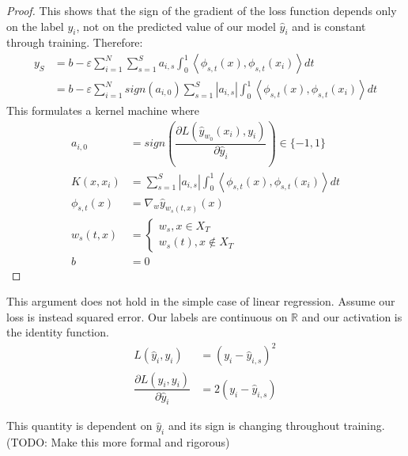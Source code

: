 \begin{proof}
This shows that the sign of the gradient of the loss function depends only on the label $y_i$, not on the predicted value of our model $\hat y_i$ and is constant through training. 
Therefore:
\begin{align}
    y_S &= b - \varepsilon \sum_{i = 1}^{N}\sum_{s = 1}^S a_{i, s}  \int_0^1 \left\langle \phi_{s,t}(x), \phi_{s,t}(x_i)\right\rangle dt\\
     &= b - \varepsilon \sum_{i = 1}^{N}sign(a_{i, 0}) \sum_{s = 1}^S |a_{i, s}| \int_0^1 \left\langle \phi_{s,t}(x), \phi_{s,t}(x_i)\right\rangle dt
\end{align}
This formulates a kernel machine where
\begin{align}
a_{i, 0} &= sign(\dfrac{\partial L(\hat y_{w_0}(x_i),  y_i)}{\partial \hat y_i}) \in \{-1, 1\} \\
K(x, x_i) &= \sum_{s = 1}^S |a_{i, s}| \int_0^1 \left\langle \phi_{s,t}(x), \phi_{s,t}(x_i)\right\rangle dt \\
\phi_{s,t}(x) &=  \nabla_w \hat y_{w_s(t,x)} (x)\\
w_s(t,x) &= \begin{cases} w_s, x \in X_T\\ w_s(t), x \notin X_T \end{cases}\\
b &= 0
\end{align}
\end{proof}


This argument does not hold in the simple case of linear regression. 
Assume our loss is instead squared error. Our labels are continuous on $\mathds{R}$ and our activation is the identity function.
\begin{align}
    L(\hat y_i,  y_i) 
    &= (y_i - \hat y_{i, s})^2 \\
    \dfrac{\partial L(\hat y_i,  y_i)}{\partial \hat y_i} &= 2(y_i- \hat y_{i, s})
\end{align}

This quantity is dependent on $\hat y_i$ and its sign is changing throughout training. (TODO: Make this more formal and rigorous)


